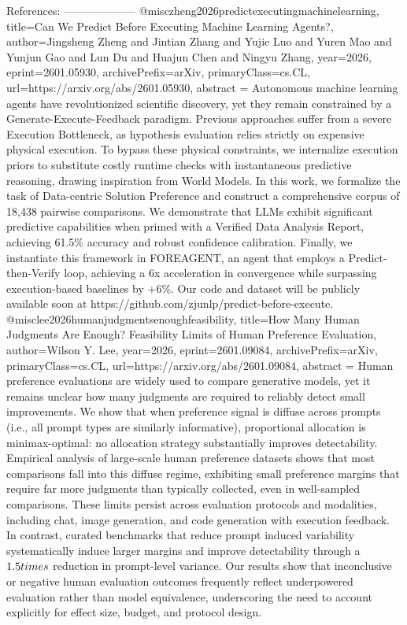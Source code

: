         References:
        --------------------
        @misc{zheng2026predictexecutingmachinelearning,
      title={Can We Predict Before Executing Machine Learning Agents?}, 
      author={Jingsheng Zheng and Jintian Zhang and Yujie Luo and Yuren Mao and Yunjun Gao and Lun Du and Huajun Chen and Ningyu Zhang},
      year={2026},
      eprint={2601.05930},
      archivePrefix={arXiv},
      primaryClass={cs.CL},
      url={https://arxiv.org/abs/2601.05930},
      abstract = {Autonomous machine learning agents have revolutionized scientific discovery, yet they remain constrained by a Generate-Execute-Feedback paradigm. Previous approaches suffer from a severe Execution Bottleneck, as hypothesis evaluation relies strictly on expensive physical execution. To bypass these physical constraints, we internalize execution priors to substitute costly runtime checks with instantaneous predictive reasoning, drawing inspiration from World Models. In this work, we formalize the task of Data-centric Solution Preference and construct a comprehensive corpus of 18,438 pairwise comparisons. We demonstrate that LLMs exhibit significant predictive capabilities when primed with a Verified Data Analysis Report, achieving 61.5\% accuracy and robust confidence calibration. Finally, we instantiate this framework in FOREAGENT, an agent that employs a Predict-then-Verify loop, achieving a 6x acceleration in convergence while surpassing execution-based baselines by +6\%. Our code and dataset will be publicly available soon at https://github.com/zjunlp/predict-before-execute.}
}@misc{lee2026humanjudgmentsenoughfeasibility,
      title={How Many Human Judgments Are Enough? Feasibility Limits of Human Preference Evaluation}, 
      author={Wilson Y. Lee},
      year={2026},
      eprint={2601.09084},
      archivePrefix={arXiv},
      primaryClass={cs.CL},
      url={https://arxiv.org/abs/2601.09084},
      abstract = {Human preference evaluations are widely used to compare generative models, yet it remains unclear how many judgments are required to reliably detect small improvements. We show that when preference signal is diffuse across prompts (i.e., all prompt types are similarly informative), proportional allocation is minimax-optimal: no allocation strategy substantially improves detectability. Empirical analysis of large-scale human preference datasets shows that most comparisons fall into this diffuse regime, exhibiting small preference margins that require far more judgments than typically collected, even in well-sampled comparisons. These limits persist across evaluation protocols and modalities, including chat, image generation, and code generation with execution feedback. In contrast, curated benchmarks that reduce prompt induced variability systematically induce larger margins and improve detectability through a $1.5\\times$ reduction in prompt-level variance. Our results show that inconclusive or negative human evaluation outcomes frequently reflect underpowered evaluation rather than model equivalence, underscoring the need to account explicitly for effect size, budget, and protocol design.}
}
